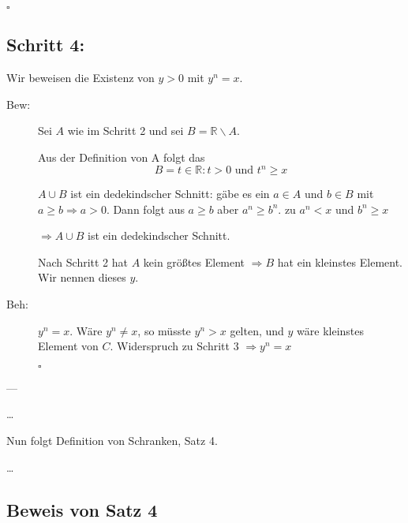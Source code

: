 \documentclass[12pt,a4paper,leqno]{article}
\begin{document}
\begin{flushright} $\square$ \end{flushright}

\subsection*{Schritt 4:}

Wir beweisen die Existenz von $y > 0$ mit $y^n = x$.

\begin{description}

\item[Bew:] Sei $A$ wie im Schritt 2 und sei $B = \mathbb{R} \backslash A$.

Aus der Definition von A folgt das 
$$ B = { t \in \mathbb{R} : t > 0 \textrm{ und } t^n \geq x } $$

$A \cup B$ ist ein dedekindscher Schnitt: gäbe es ein $a \in A$ und $b \in B$ mit $a \geq b \Rightarrow a > 0$. Dann folgt aus $a \geq b$ aber $a^n \geq b^n$. \blitze{} zu $a^n < x$ und $b^n \geq x$ 
 
$ \Rightarrow A \cup B$  ist ein dedekindscher Schnitt.

Nach Schritt 2 hat $A$ kein größtes Element $\Rightarrow B$ hat ein kleinstes Element. Wir nennen dieses $y$.

\item[Beh:] $y^n = x$. Wäre $y^n \neq x$, so müsste $y^n > x$ gelten, und $y$ wäre kleinstes Element von $C$. Widerspruch zu Schritt 3 $\Rightarrow y^n = x$
\begin{flushright} $ \square $ \end{flushright}
\end{description}

---

\ldots

Nun folgt Definition von Schranken, Satz 4.

\ldots

\subsection*{Beweis von Satz 4}
\end{document}

